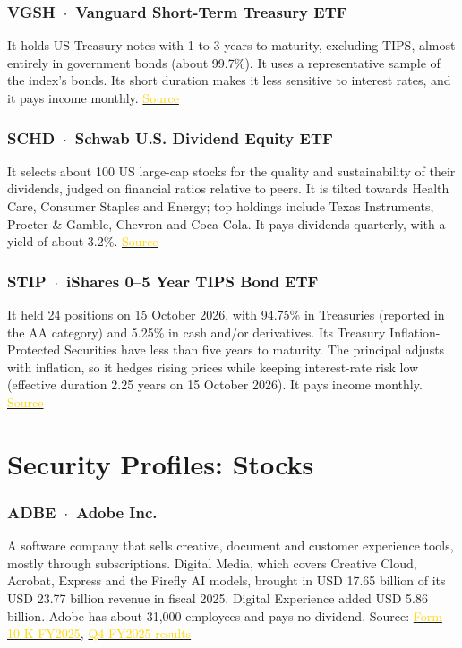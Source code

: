 \documentclass[10pt,a4paper]{article}
\begin{document}
\subsubsection*{VGSH \,$\cdot$\, Vanguard Short-Term Treasury ETF}
It holds US Treasury notes with 1 to 3 years to maturity, excluding TIPS, almost entirely in government
bonds (about 99.7\%). It uses a representative sample of the index's bonds. Its short duration makes it
less sensitive to interest rates, and it pays income monthly.
\href{https://investor.vanguard.com/investment-products/etfs/profile/vgsh}{\textcolor{gold}{Source}}

\subsubsection*{SCHD \,$\cdot$\, Schwab U.S. Dividend Equity ETF}
It selects about 100 US large-cap stocks for the quality and sustainability of their dividends, judged on
financial ratios relative to peers. It is tilted towards Health Care, Consumer Staples and Energy; top holdings
include Texas Instruments, Procter \& Gamble, Chevron and Coca-Cola. It pays dividends quarterly, with a
yield of about 3.2\%.
\href{https://www.schwabassetmanagement.com/products/schd}{\textcolor{gold}{Source}}

\subsubsection*{STIP \,$\cdot$\, iShares 0--5 Year TIPS Bond ETF}
It held 24 positions on 15 October 2026, with 94.75\% in Treasuries (reported in the AA category) and 5.25\% in cash and/or derivatives. Its Treasury Inflation-Protected Securities have less than five years to maturity. The principal adjusts with inflation, so it hedges rising prices while keeping interest-rate risk low
(effective duration 2.25 years on 15 October 2026). It pays income monthly.
\href{https://www.blackrock.com/us/individual/products/239450/ishares-0-5-year-tips-bond-etf}{\textcolor{gold}{Source}}

\clearpage
\section*{Security Profiles: Stocks}
\subsubsection*{ADBE \,$\cdot$\, Adobe Inc.}
A software company that sells creative, document and customer experience tools, mostly through subscriptions. Digital Media, which covers Creative Cloud, Acrobat, Express and the Firefly AI models, brought in USD 17.65 billion of its USD 23.77 billion revenue in fiscal 2025. Digital Experience added USD 5.86 billion. Adobe has about 31,000 employees and pays no dividend.
Source: \href{https://www.sec.gov/Archives/edgar/data/796343/000079634326000003/adbe-20251128.htm}{\textcolor{gold}{Form 10-K FY2025}}, \href{https://www.adobe.com/cc-shared/assets/investor-relations/pdfs/01215202/cjy35yjtgawfe.pdf}{\textcolor{gold}{Q4 FY2025 results}}
\end{document}
